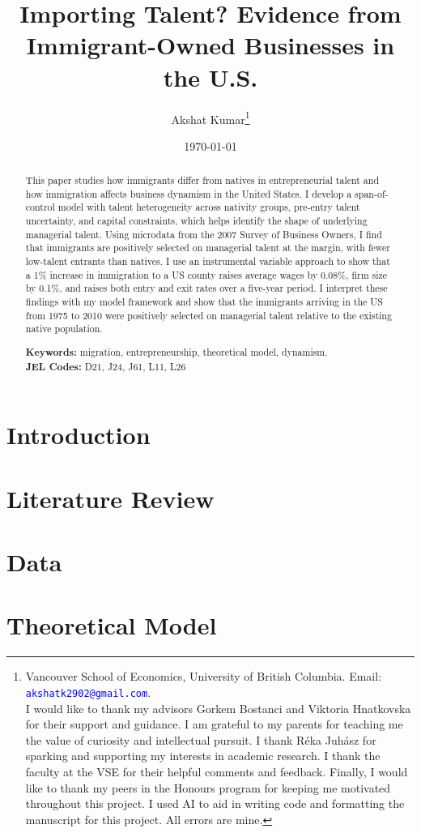 \documentclass[12pt, a4paper]{article}
\title{Importing Talent? Evidence from  \\
        Immigrant-Owned Businesses in the U.S.}
\author{
  Akshat Kumar\thanks{Vancouver School of Economics, University of British Columbia. Email: \texttt{\textcolor{blue}{akshatk2902@gmail.com}}. \\ I would like to thank my advisors Gorkem Bostanci and Viktoria Hnatkovska for their support and guidance. I am grateful to my parents for teaching me the value of curiosity and intellectual pursuit. I thank Réka Juhász for sparking and supporting my interests in academic research. I thank the faculty at the VSE for their helpful comments and feedback. Finally, I would like to thank my peers in the Honours program for keeping me motivated throughout this project. I used AI to aid in writing code and formatting the manuscript for this project. All errors are mine.}
}
\date{\today}
\theoremstyle{definition}   %
\begin{document}
\maketitle
\thispagestyle{empty}
\setcounter{page}{0}

\begin{abstract}
\noindent
    This paper studies how immigrants differ from natives in entrepreneurial talent and how immigration affects business dynamism in the United States. I develop a span-of-control model with talent heterogeneity across nativity groups, pre-entry talent uncertainty, and capital constraints, which helps identify the shape of underlying managerial talent. Using microdata from the 2007 Survey of Business Owners, I find that immigrants are positively selected on managerial talent at the margin, with fewer low-talent entrants than natives. I use an instrumental variable approach to show that a 1\% increase in immigration to a US county raises average wages by 0.08\%, firm size by 0.1\%, and raises both entry and exit rates over a five-year period. I interpret these findings with my model framework and show that the immigrants arriving in the US from 1975 to 2010 were positively selected on managerial talent relative to the existing native population.
    
\medskip
\noindent\textbf{Keywords:} migration, entrepreneurship, theoretical model, dynamism. \\
\noindent\textbf{JEL Codes:} D21, J24, J61, L11, L26
\end{abstract}

\newpage

\section{Introduction} \label{sec:intro}



\section{Literature Review} \label{sec:lit}


\section{Data} \label{sec:data}


\section{Theoretical Model} \label{sec:model}

\end{document}
